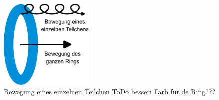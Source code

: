\begin{figure}
\centering
\includegraphics[width=0.4\textwidth]{papers/wirbelringe/fig/ausbreitung_teilchen.pdf}
\caption{Bewegung eines einzelnen Teilchen ToDo besseri Farb für de Ring??? \label{buch:papers:Wirbelringe:fig:ausbreitung_teilchen}}
\end{figure}